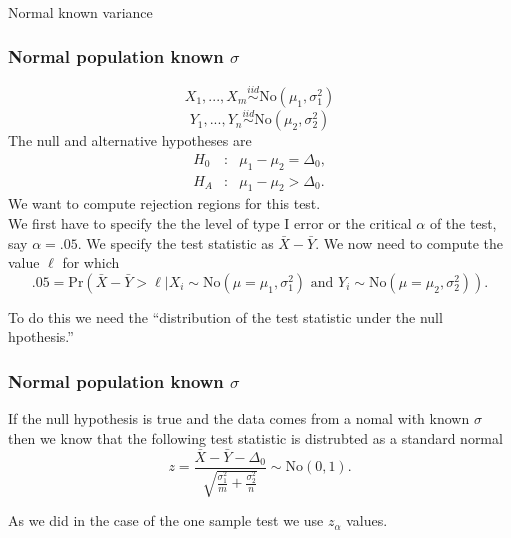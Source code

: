 \begin{frame}[fragile]\frametitle{}
\begin{center}
{\Large Normal known variance}

\end{center}
\end{frame}




\begin{frame}[fragile]\frametitle{Normal population known $\sigma$}

{\tiny
$$X_1,...,X_m \stackrel{iid}{\sim} \mbox{No}(\mu_1,\sigma_1^2)$$
$$Y_1,...,Y_n \stackrel{iid}{\sim} \mbox{No}(\mu_2,\sigma_2^2)$$
The null and alternative hypotheses are
\begin{eqnarray*}
H_0&:& \mu_1 - \mu_2 = \Delta_0, \\
H_A&:& \mu_1 -  \mu_2 > \Delta_0.
\end{eqnarray*}
We want to compute rejection regions for this test. \\
We first have to specify the the level of type I error
or the critical $\alpha$ of the test, say $\alpha =.05$.
We specify the test statistic as $\bar{X}-\bar{Y}$. We now
need to compute the value $\ell$ for which
$$.05 = \mbox{Pr}(\bar{X}-\bar{Y} > \ell | X_i \sim
\mbox{No}(\mu=\mu_1,\sigma_1^2) \mbox{ and } Y_i \sim
\mbox{No}(\mu=\mu_2,\sigma_2^2)).$$

To do this we need the ``distribution of the test statistic under the
null hpothesis.''

 }
\end{frame}


\begin{frame}[fragile]\frametitle{Normal population known $\sigma$}

{\tiny

If the null hypothesis is true and the data comes from
a nomal with known $\sigma$ then we know that the following
test statistic is distrubted as a standard normal
$$z = \frac{\bar{X}-\bar{Y}-\Delta_0}{\sqrt{\frac{\sigma_1^2}{m}+\frac{\sigma_2^2}{n}}} \sim \mbox{No}(0,1).$$

As we did in the case of the one sample test we use $z_\alpha$ values.
}

\end{frame}




